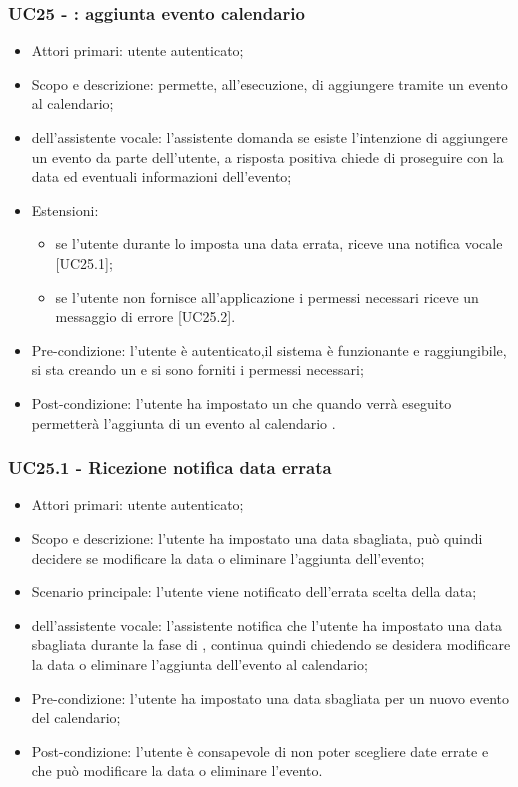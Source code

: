 \subsubsection{UC25 - : aggiunta evento calendario}
\begin{itemize}
	\item  Attori primari: utente autenticato;
	\item  Scopo e descrizione: permette, all'esecuzione, di aggiungere tramite  un evento al calendario;
	\item  {} dell'assistente vocale: l'assistente domanda se esiste l'intenzione di aggiungere un evento da parte dell'utente, a risposta positiva chiede di proseguire con la data ed eventuali informazioni dell'evento;
	\item  Estensioni: 
		   \begin{itemize}
			    \item se l'utente durante lo  imposta una data errata, riceve una notifica vocale [UC25.1];
				\item se l'utente non fornisce all'applicazione i permessi necessari riceve un messaggio di errore [UC25.2].
		   \end{itemize}
	\item  Pre-condizione: l'utente è autenticato,il sistema è funzionante e raggiungibile, si sta creando un  e si sono forniti i permessi necessari;
	\item  Post-condizione: l'utente ha impostato un  che quando verrà eseguito permetterà l'aggiunta di un evento al calendario .
\end{itemize}
\subsubsection{UC25.1 - Ricezione notifica data errata}
\begin{itemize}
	\item  Attori primari: utente autenticato;
	\item  Scopo e descrizione: l'utente ha impostato una data sbagliata, può quindi decidere se modificare la data o eliminare l'aggiunta dell'evento;
	\item  Scenario principale: l'utente viene notificato dell'errata scelta della data;
	\item  {} dell'assistente vocale: l'assistente notifica che l'utente ha impostato una data sbagliata durante la fase di , continua quindi chiedendo se desidera modificare la data o eliminare l'aggiunta dell'evento al calendario;
	\item  Pre-condizione: l'utente ha impostato una data sbagliata per un nuovo evento del calendario;
	\item  Post-condizione: l'utente è consapevole di non poter scegliere date errate e che può modificare la data o eliminare l'evento.
\end{itemize}
